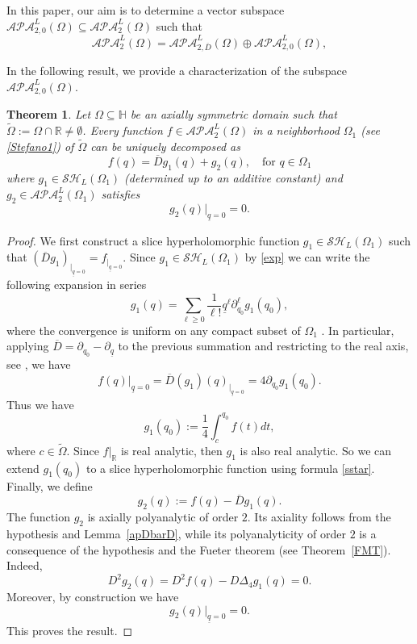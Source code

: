 \documentclass[reqno,11pt]{amsart}
\numberwithin{equation}{section}
\newcommand{\unq}{\underline{q}}
\newtheorem{theorem}{Theorem}[section]
\theoremstyle{definition}
\begin{document}
In this paper, our aim is to determine a vector subspace $\mathcal{APA}^L_{2,0}(\Omega) \subseteq \mathcal{APA}^L_2(\Omega)$ such that
\begin{equation}\label{decomp_1}
	\mathcal{APA}^L_2(\Omega
	)
	=
	\mathcal{APA}^L_{2, \overline{D}}(\Omega)
	\oplus \mathcal{APA}^L_{2,0}(\Omega) ,
\end{equation}

In the following result, we provide a characterization of the subspace $\mathcal{APA}^L_{2,0}(\Omega) $.

 \begin{theorem}\label{t2}
 	Let $\Omega \subseteq \mathbb H$ be an axially symmetric domain such that $\tilde\Omega:=\Omega \cap\mathbb R\neq \emptyset$.
 	Every function $f\in \mathcal{APA}^L_2(\Omega)$ in a neighborhood $\Omega_1$ (see \eqref{Stefano1}) of $\tilde \Omega$ can be uniquely decomposed as
 	\begin{equation}\label{Stefano2}
 	f(q)=\overline D g_1(q) + g_2(q), \quad\textrm{for $q\in\Omega_1$}
 	\end{equation}
 	where $g_1\in\mathcal{SH}_L( \Omega_1)$ (determined up to an additive constant) and $g_2\in \mathcal{APA}^L_2(\Omega_1)$ satisfies
 	\[
 	g_2(q)|_{\underline q=0}=0.
 	\]
 \end{theorem}


\begin{proof}
	We first construct a slice hyperholomorphic function $g_1\in\mathcal{SH}_L(\Omega_1)$ such that ${(\overline Dg_1)}_{|_{\unq=0}}=f_{|_{\unq=0}}$. Since $g_1 \in \mathcal{SH}_L( \Omega_1)$ by \eqref{exp} we can write the following expansion in series
	\begin{equation}
\label{sstar}
g_1(q)=\sum_{\ell\geq 0} \frac{1}{\ell !} \unq^\ell \partial^\ell_{q_0} g_1(q_0),
	\end{equation}
	where the convergence is uniform on any compact subset of $\Omega_1$ . In particular, applying $\overline D=\partial_{q_0}-\partial_{\underline q}$ to the previous summation and restricting to the real axis, see \cite[Thm. 4.10]{CDS2025}, we have
	$$ f(q)|_{\underline{q}=0}=\overline D(g_1)(q)_{|_{\unq=0}}= 4\partial_{q_0} g_1(q_0). $$
	Thus we have
	$$ g_1(q_0):=\frac 14 \int_c^{q_0} f(t)dt, $$
	where $c\in \tilde \Omega$. Since $f|_{\mathbb R}$ is real analytic, then $g_1$ is also real analytic. So we can extend $g_1(q_0)$ to a slice hyperholomorphic function using formula \eqref{sstar}. Finally, we define
	\[
	g_2(q):=f(q)-\overline D g_1(q).
	\]
The function $g_2$ is axially polyanalytic of order $2$. Its axiality follows from the hypothesis and Lemma~\ref{apDbarD}, while its polyanalyticity of order $2$ is a consequence of the hypothesis and the Fueter theorem (see Theorem~\ref{FMT}). Indeed,
$$
D^2 g_2(q) = D^2 f(q) - D \Delta_4 g_1(q) = 0.
$$
Moreover, by construction we have
	$$g_2(q)|_{\underline q=0}=0.$$
This proves the result.
\end{proof}
\end{document}
